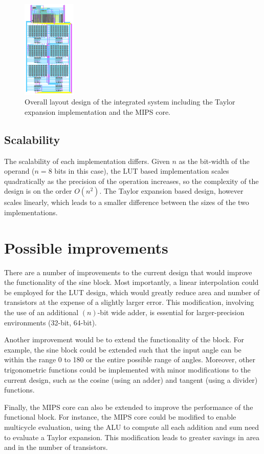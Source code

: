 \documentclass[10pt,journal]{IEEEtran}
\begin{document}
\begin{figure}[h]
\centering
\includegraphics[width=1in]{taylor_global.png}
\caption{Overall layout design of the integrated system including the Taylor expansion implementation and the MIPS core.}
\label{taylor_global}
\end{figure}

\subsection{Scalability}
The scalability of each implementation differs. Given $n$ as the bit-width of the operand ($n = 8$ bits in this case), the LUT based implementation scales quadratically as the precision of the operation increases, so the complexity of the design is on the order $O(n^2)$. The Taylor expansion based design, however scales linearly, which leads to a smaller difference between the sizes of the two implementations.

\section{Possible improvements}
There are a number of improvements to the current design that would improve the functionality of the sine block. Most importantly, a linear interpolation could be employed for the LUT design, which would greatly reduce area and number of transistors at the expense of a slightly larger error. This modification, involving the use of an additional $(n)$-bit wide adder, is essential for larger-precision environments (32-bit, 64-bit).

Another improvement would be to extend the functionality of the block. For example, the sine block could be extended such that the input angle can be within the range 0 to 180 or the entire possible range of angles. Moreover, other trigonometric functions could be implemented with minor modifications to the current design, such as the cosine (using an adder) and tangent (using a divider) functions.

Finally, the MIPS core can also be extended to improve the performance of the functional block. For instance, the MIPS core could be modified to enable multicycle evaluation, using the ALU to compute all each addition and sum need to evaluate a Taylor expansion. This modification  leads to greater savings in area and in the number of transistors.
\end{document}
